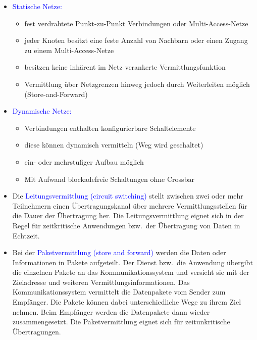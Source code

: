 \begin{itemize}
    \item \textcolor{blue}{Statische Netze:}
    \begin{itemize}
        \item fest verdrahtete Punkt-zu-Punkt Verbindungen oder Multi-Access-Netze
        \item jeder Knoten besitzt eine feste Anzahl von Nachbarn oder einen Zugang zu einem Multi-Access-Netze
        \item besitzen keine inhärent im Netz verankerte Vermittlungsfunktion
        \item Vermittlung über Netzgrenzen hinweg jedoch durch Weiterleiten möglich (Store-and-Forward)
    \end{itemize}
    \item \textcolor{blue}{Dynamische Netze:}
    \begin{itemize}
        \item Verbindungen enthalten konfigurierbare Schaltelemente
        \item diese können dynamisch vermitteln (Weg wird geschaltet)
        \item ein- oder mehrstufiger Aufbau möglich
        \item Mit Aufwand blockadefreie Schaltungen ohne Crossbar
    \end{itemize}
\end{itemize}

\begin{itemize}
    \item Die \textcolor{blue}{Leitungsvermittlung (circuit switching)} stellt zwischen zwei oder mehr Teilnehmern einen Übertragungskanal über mehrere Vermittlungsstellen für die Dauer der Übertragung her.
    Die Leitungsvermittlung eignet sich in der Regel für zeitkritische Anwendungen bzw.\ der Übertragung von Daten in Echtzeit.
    \item Bei der  \textcolor{blue}{Paketvermittlung (store and forward)} werden die Daten oder Informationen in Pakete aufgeteilt.
    Der Dienst bzw.\ die Anwendung übergibt die einzelnen Pakete an das Kommunikationssystem und versieht sie mit der Zieladresse und weiteren Vermittlungsinformationen.
    Das Kommunikationssystem vermittelt die Datenpakete vom Sender zum Empfänger.
    Die Pakete können dabei unterschiedliche Wege zu ihrem Ziel nehmen.
    Beim Empfänger werden die Datenpakete dann wieder zusammengesetzt.
    Die Paketvermittlung eignet sich für zeitunkritische Übertragungen.
\end{itemize}


